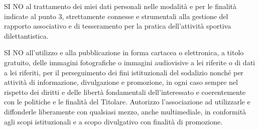\documentclass[
	headerstyle = TitleDojoFijlkam
]{djtsmod}
\begin{document}
	\squarelabel\; SI \quad \squarelabel\; NO \quad al trattamento dei miei dati personali nelle modalità e per le finalità indicate al punto 3, strettamente connesse e strumentali alla gestione del rapporto associativo e di tesseramento per la pratica dell'attività sportiva dilettantistica.
	\vspace{0.05in}
	
	\squarelabel\; SI \quad \squarelabel\; NO \quad all'utilizzo e alla pubblicazione in forma cartacea o elettronica, a titolo gratuito, delle immagini fotografiche o immagini audiovisive a lei riferite o di dati a lei riferiti, per il perseguimento dei fini istituzionali del sodalizio nonché per attività di informazione, divulgazione e promozione, in ogni caso sempre nel rispetto dei diritti e delle libertà fondamentali dell'interessato e coerentemente con le politiche e le finalità del Titolare. Autorizzo l'associazione ad utilizzarle e diffonderle liberamente con qualsiasi mezzo, anche multimediale, in conformità agli scopi istituzionali e a scopo divulgativo con finalità di promozione.
	\vspace{0.05in}
	
\end{document}
